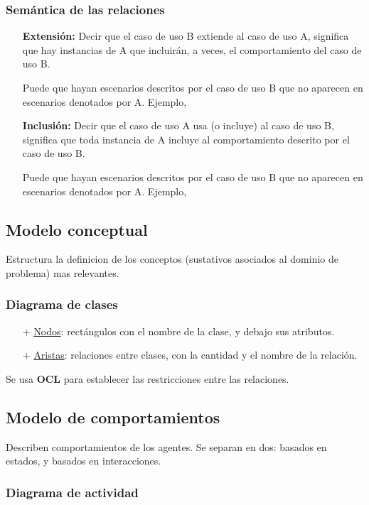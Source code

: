   \subsubsection*{Sem\'antica de las relaciones}
  
  \begin{enumerate}
   \item[{\bf Extensi\'on:}] Decir que el caso de uso B extiende al caso de uso A, significa que hay instancias de A que incluir\'an, a veces, el comportamiento del caso de uso B. 
   
   Puede que hayan escenarios descritos por el caso de uso B que no aparecen en escenarios denotados por A. Ejemplo,
   
   
   \item[{\bf Inclusi\'on:}] Decir que el caso de uso A usa (o incluye) al caso de uso B, significa que toda instancia de A incluye al comportamiento descrito por el caso de uso B. 
   
   Puede que hayan escenarios descritos por el caso de uso B que no aparecen en escenarios denotados por A. Ejemplo,
   
  \end{enumerate}

 
\subsection{Modelo conceptual}

  Estructura la definicion de los conceptos (sustativos asociados al dominio de problema) mas relevantes. 

  \subsubsection{Diagrama de clases}
  \begin{itemize}
    \item[+] \underline{Nodos}: rect\'angulos con el nombre de la clase, y debajo sus atributos.
    \item[+] \underline{Aristas}: relaciones entre clases, con la cantidad y el nombre de la relaci\'on. 
  \end{itemize}

  Se usa {\bf OCL} para establecer las restricciones entre las relaciones.

\subsection{Modelo de comportamientos}

  Describen comportamientos de los agentes. Se separan en dos: basados en estados, y basados en interacciones. 

  \subsubsection{Diagrama de actividad}


